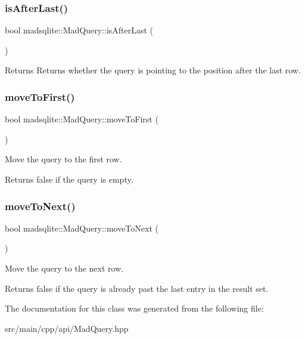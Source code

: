\subsubsection{\texorpdfstring{is\+After\+Last()}{isAfterLast()}}
{\footnotesize\ttfamily bool madsqlite\+::\+Mad\+Query\+::is\+After\+Last (\begin{DoxyParamCaption}{ }\end{DoxyParamCaption})}

\begin{DoxyReturn}{Returns}
Returns whether the query is pointing to the position after the last row. 
\end{DoxyReturn}
\hypertarget{classmadsqlite_1_1_mad_query_a37a601031ecedf20e53b8c0f610f74b0}{}\label{classmadsqlite_1_1_mad_query_a37a601031ecedf20e53b8c0f610f74b0} 
\subsubsection{\texorpdfstring{move\+To\+First()}{moveToFirst()}}
{\footnotesize\ttfamily bool madsqlite\+::\+Mad\+Query\+::move\+To\+First (\begin{DoxyParamCaption}{ }\end{DoxyParamCaption})}

Move the query to the first row. \begin{DoxyReturn}{Returns}
false if the query is empty. 
\end{DoxyReturn}
\hypertarget{classmadsqlite_1_1_mad_query_a2eecba50378a4577803aff41671829fe}{}\label{classmadsqlite_1_1_mad_query_a2eecba50378a4577803aff41671829fe} 
\subsubsection{\texorpdfstring{move\+To\+Next()}{moveToNext()}}
{\footnotesize\ttfamily bool madsqlite\+::\+Mad\+Query\+::move\+To\+Next (\begin{DoxyParamCaption}{ }\end{DoxyParamCaption})}

Move the query to the next row. \begin{DoxyReturn}{Returns}
false if the query is already past the last entry in the result set. 
\end{DoxyReturn}


The documentation for this class was generated from the following file\+:\begin{DoxyCompactItemize}
\item 
src/main/cpp/api/Mad\+Query.\+hpp\end{DoxyCompactItemize}
